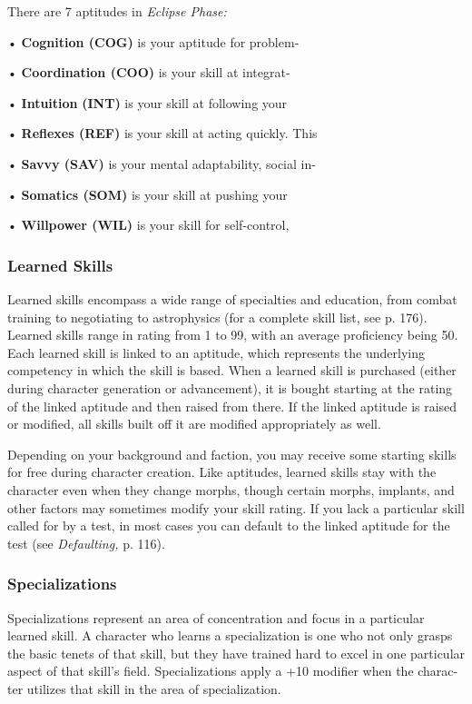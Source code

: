 There are 7 aptitudes in \textit{Eclipse Phase:}

•  \textbf{Cognition (COG)} is your aptitude for problem-

•  \textbf{Coordination (COO)} is your skill at integrat-

•  \textbf{Intuition} \textbf{(INT)} is your skill at following your 

•  \textbf{Reflexes (REF)} is your skill at acting quickly. This 

•  \textbf{Savvy (SAV)} is your mental adaptability, social in-

•  \textbf{Somatics (SOM)} is your skill at pushing your 

•  \textbf{Willpower (WIL)} is your skill for self-control, 

\subsubsection{Learned Skills}

Learned skills encompass a wide range of specialties 
and education, from combat training to negotiating 
to astrophysics (for a complete skill list, see p. 176). 
Learned skills range in rating from 1 to 99, with an 
average proficiency being 50. Each learned skill is 
linked to an aptitude, which represents the underlying 
competency in which the skill is based. When a learned 
skill is purchased (either during character generation 
or advancement), it is bought starting at the rating of 
the linked aptitude and then raised from there. If the 
linked aptitude is raised or modified, all skills built off 
it are modified appropriately as well.

Depending on your background and faction, you 
may receive some starting skills for free during 
character creation. Like aptitudes, learned skills stay 
with the character even when they change morphs, 
though certain morphs, implants, and other factors 
may sometimes modify your skill rating. If you lack 
a particular skill called for by a test, in most cases 
you can default to the linked aptitude for the test (see 
\textit{Defaulting,} p. 116).

\subsubsection{Specializations}

Specializations represent an area of concentration and 
focus in a particular learned skill. A character who 
learns a specialization is one who not only grasps the 
basic tenets of that skill, but they have trained hard 
to excel in one particular aspect of that skill's field. 
Specializations apply a +10 modifier when the charac-
ter utilizes that skill in the area of specialization.

